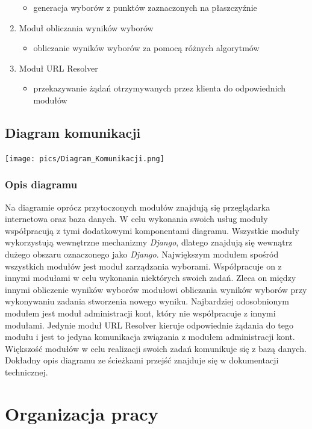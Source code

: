 \documentclass[polish,11pt]{aghthesis}
\begin{document}
\begin{enumerate}[leftmargin=0.5cm]
\begin{itemize}
	\item generacja wyborów z punktów zaznaczonych na płaszczyźnie
	\end{itemize}
\item Moduł obliczania wyników wyborów
	\begin{itemize}
	\item obliczanie wyników wyborów za pomocą różnych algorytmów
	\end{itemize}
\item Moduł URL Resolver
	\begin{itemize}
	\item przekazywanie żądań otrzymywanych przez klienta do odpowiednich modułów
	\end{itemize}
\end{enumerate}
\clearpage

\subsection{Diagram komunikacji}
\begin{center}
\centerline{\texttt{[image: pics/Diagram\_Komunikacji.png]}}
\end{center}

\subsubsection{Opis diagramu}
Na diagramie oprócz przytoczonych modułów znajdują się przeglądarka internetowa oraz
baza danych. W celu wykonania swoich usług moduły współpracują z tymi dodatkowymi
komponentami diagramu. Wszystkie moduły wykorzystują wewnętrzne mechanizmy \textit{Django},
dlatego znajdują się wewnątrz dużego obszaru oznaczonego jako \textit{Django}. Największym
modułem spośród wszystkich modułów jest moduł zarządzania wyborami. Współpracuje on
z innymi modułami w celu wykonania niektórych swoich zadań. Zleca on między innymi
obliczenie wyników wyborów modułowi obliczania wyników wyborów przy wykonywaniu
zadania stworzenia nowego wyniku. Najbardziej odosobnionym modułem jest moduł
administracji kont, który nie współpracuje z innymi modułami. Jedynie moduł URL Resolver
kieruje odpowiednie żądania do tego modułu i jest to jedyna komunikacja związania z
modułem administracji kont. Większość modułów w celu realizacji swoich zadań komunikuje
się z bazą danych. Dokładny opis diagramu ze ścieżkami przejść znajduje się w dokumentacji
technicznej.
\newpage

\section{Organizacja pracy}
\end{document}
